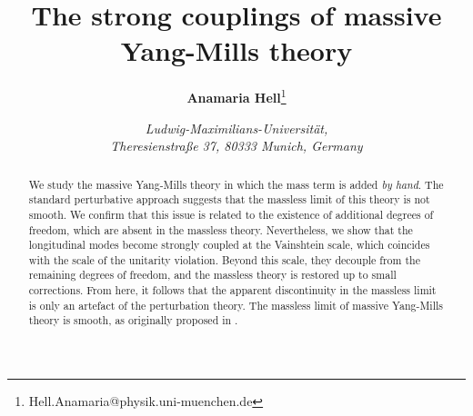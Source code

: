 \documentclass{article}
\title{\vfill \textbf{The strong couplings of massive Yang-Mills theory}}
\author{\textbf{Anamaria Hell}\footnote{Hell.Anamaria@physik.uni-muenchen.de}}
\date{\textit{ Ludwig-Maximilians-Universität,\\
Theresienstraße 37, 80333 Munich, Germany}}
\begin{document}
\maketitle
\thispagestyle{empty} 

\begin{abstract}
We study the massive Yang-Mills theory in which the mass term is added \textit{by hand}. The standard perturbative approach suggests that the massless limit of this theory is not smooth. We confirm that this issue is related to the existence of additional degrees of freedom, which are absent in the massless theory. Nevertheless, we show that the longitudinal modes become strongly coupled at the Vainshtein scale, which coincides with the scale of the unitarity violation. Beyond this scale, they decouple from the remaining degrees of freedom, and the massless theory is restored up to small corrections. From here, it follows that the apparent discontinuity in the massless limit is only an artefact of the perturbation theory. The massless limit of massive Yang-Mills theory is smooth, as originally proposed in \cite{Vainshtein}.
\end{abstract}
\vspace*{\fill}

\clearpage
{} 
\newpage
\end{document}
